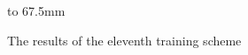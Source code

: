 \begin{figure}[p]
    \hbox to 67.5mm{}%
    \caption{The results of the eleventh training scheme}
    \label{fig:training_scheme_11}
\end{figure}



